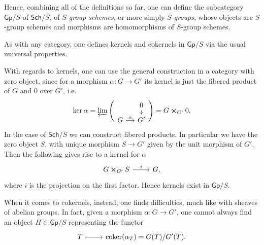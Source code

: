 \begin{defn}\label{defn:CatOfGroupSchemes}
	Hence, combining all of the definitions so far, 
	one can define the subcategory $\mathsf{Gp}/S$ of $\mathsf{Sch}/S$,
	of {\em $S$-group schemes}, or more simply {\em $S$-groups},
	whose objects are $S$-group schemes
	and morphisms are homomorphisms of $S$-group schemes.
\end{defn}


\begin{rem}
	As with any category, one defines kernels and cokernels 
	in $\mathsf{Gp}/S$ via the usual universal properties.

	With regards to kernels, one can use the general construction 
	in a category with zero object,
	since for a morphism $\alpha\colon G \to G'$ its kernel
	is just the fibered product of $G$ and $0$ over $G'$, i.e.
	\begin{equation*}
		\ker \alpha =
		\varprojlim \Bigg(
			\begin{tikzcd}[row sep=0.60em, column sep=1.2em]
			&
			0 \arrow[d, "", rightarrow] \\
			G \arrow[r, "\alpha", rightarrow] &
			G'
		\end{tikzcd} \Bigg)
		= G \cross_{G'} 0
	.\end{equation*}
	In the case of $\mathsf{Sch}/S$ we can construct fibered products.
	In particular we have the zero object $S$, with unique morphism
	$S \to G'$ given by the unit morphism of $G'$.
	Then the following gives rise to a kernel for $\alpha$
	\begin{equation*}
	\begin{tikzcd}
		G \cross_{ G' } S \arrow[r, "i", rightarrow] &
		G,
	\end{tikzcd}
	\end{equation*} 
	where $i$ is the projection on the first factor.
	Hence kernels exist in $\mathsf{Gp}/S$.
	
	When it comes to cokernels, instead, one finds difficulties, much like
	with sheaves of abelian groups.
	In fact, given a morphism $\alpha\colon G \to G'$, one cannot always find an
	object $H \in \mathsf{Gp}/S$ representing the functor
	\begin{equation*}
	\begin{tikzcd}
		T \arrow[r, "", mapsto] &
		\coker (\alpha_T) =
		G(T)/G'(T).
	\end{tikzcd}
	\end{equation*}
\end{rem}




